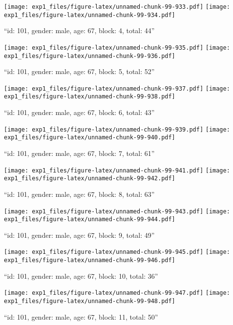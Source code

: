 \documentclass[,]{article}
\begin{document}
\texttt{[image: exp1\_files/figure-latex/unnamed-chunk-99-933.pdf]}
\texttt{[image: exp1\_files/figure-latex/unnamed-chunk-99-934.pdf]}

\newpage
[1] 

``id: 101, gender: male, age: 67, block: 4, total: 44''

\texttt{[image: exp1\_files/figure-latex/unnamed-chunk-99-935.pdf]}
\texttt{[image: exp1\_files/figure-latex/unnamed-chunk-99-936.pdf]}

\newpage
[1] 

``id: 101, gender: male, age: 67, block: 5, total: 52''

\texttt{[image: exp1\_files/figure-latex/unnamed-chunk-99-937.pdf]}
\texttt{[image: exp1\_files/figure-latex/unnamed-chunk-99-938.pdf]}

\newpage
[1] 

``id: 101, gender: male, age: 67, block: 6, total: 43''

\texttt{[image: exp1\_files/figure-latex/unnamed-chunk-99-939.pdf]}
\texttt{[image: exp1\_files/figure-latex/unnamed-chunk-99-940.pdf]}

\newpage
[1] 

``id: 101, gender: male, age: 67, block: 7, total: 61''

\texttt{[image: exp1\_files/figure-latex/unnamed-chunk-99-941.pdf]}
\texttt{[image: exp1\_files/figure-latex/unnamed-chunk-99-942.pdf]}

\newpage
[1] 

``id: 101, gender: male, age: 67, block: 8, total: 63''

\texttt{[image: exp1\_files/figure-latex/unnamed-chunk-99-943.pdf]}
\texttt{[image: exp1\_files/figure-latex/unnamed-chunk-99-944.pdf]}

\newpage
[1] 

``id: 101, gender: male, age: 67, block: 9, total: 49''

\texttt{[image: exp1\_files/figure-latex/unnamed-chunk-99-945.pdf]}
\texttt{[image: exp1\_files/figure-latex/unnamed-chunk-99-946.pdf]}

\newpage
[1] 

``id: 101, gender: male, age: 67, block: 10, total: 36''

\texttt{[image: exp1\_files/figure-latex/unnamed-chunk-99-947.pdf]}
\texttt{[image: exp1\_files/figure-latex/unnamed-chunk-99-948.pdf]}

\newpage
[1] 

``id: 101, gender: male, age: 67, block: 11, total: 50''
\end{document}
